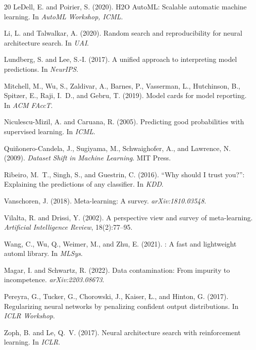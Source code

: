 \documentclass[10pt]{article}
\begin{document}
\begin{thebibliography}{20}
LeDell, E. and Poirier, S. (2020).
\newblock H2O AutoML: Scalable automatic machine learning.
\newblock In \emph{AutoML Workshop, ICML}.

Li, L. and Talwalkar, A. (2020).
\newblock Random search and reproducibility for neural architecture search.
\newblock In \emph{UAI}.

Lundberg, S. and Lee, S.-I. (2017).
\newblock A unified approach to interpreting model predictions.
\newblock In \emph{NeurIPS}.

Mitchell, M., Wu, S., Zaldivar, A., Barnes, P., Vasserman, L., Hutchinson, B.,
  Spitzer, E., Raji, I.~D., and Gebru, T. (2019).
\newblock Model cards for model reporting.
\newblock In \emph{ACM FAccT}.

Niculescu-Mizil, A. and Caruana, R. (2005).
\newblock Predicting good probabilities with supervised learning.
\newblock In \emph{ICML}.

Qui\~{n}onero-Candela, J., Sugiyama, M., Schwaighofer, A., and Lawrence, N.
  (2009).
\newblock \emph{Dataset Shift in Machine Learning}.
\newblock MIT Press.

Ribeiro, M.~T., Singh, S., and Guestrin, C. (2016).
\newblock ``Why should I trust you?'': Explaining the predictions of any
  classifier.
\newblock In \emph{KDD}.

Vanschoren, J. (2018).
\newblock Meta-learning: A survey.
\newblock \emph{arXiv:1810.03548}.

Vilalta, R. and Drissi, Y. (2002).
\newblock A perspective view and survey of meta-learning.
\newblock \emph{Artificial Intelligence Review}, 18(2):77--95.

Wang, C., Wu, Q., Weimer, M., and Zhu, E. (2021).
: A fast and lightweight automl library.
\newblock In \emph{MLSys}.

Magar, I. and Schwartz, R. (2022).
\newblock Data contamination: From impurity to incompetence.
\newblock \emph{arXiv:2203.08673}.

Pereyra, G., Tucker, G., Chorowski, J., Kaiser, \L{}., and Hinton, G. (2017).
\newblock Regularizing neural networks by penalizing confident output
  distributions.
\newblock In \emph{ICLR Workshop}.

Zoph, B. and Le, Q.~V. (2017).
\newblock Neural architecture search with reinforcement learning.
\newblock In \emph{ICLR}.

\end{thebibliography}
\end{document}
